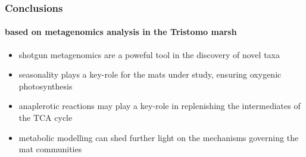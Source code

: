 \documentclass{beamer}
\begin{document}
\begin{frame}
\begin{textblock*}{4cm}
      \end{textblock*}

   \end{frame}

   \begin{frame}
      \frametitle{Conclusions}
      \framesubtitle{based on metagenomics analysis in the Tristomo marsh}

      \begin{itemize}
         \small
         \item shotgun metagenomics are a poweful tool in the discovery of novel taxa 
         \item seasonality plays a key-role for the mats under study, ensuring oxygenic photosynthesis 
         \item anaplerotic reactions may play a key-role in replenishing the intermediates of the TCA cycle
         \item metabolic modelling can shed further light on the mechanisms governing the mat communities
      \end{itemize}

   \end{frame}

\end{document}
